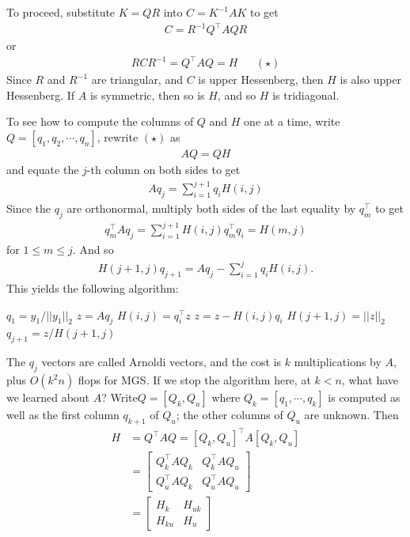 \documentclass[11pt]{article}
\numberwithin{equation}{section}
\begin{document}
To proceed, substitute $K = QR$ into $C = K^{-1}AK$ to get \begin{align*}
    C = R^{-1}Q^\top AQR 
\end{align*} 
or \begin{align*}
    RCR^{-1} = Q^\top AQ = H && (\star)
\end{align*}
Since $R$ and $R^{-1}$ are triangular, and $C$ is upper Hessenberg, then $H$ is also upper Hessenberg. If $A$ is symmetric, then so is $H$, 
and so $H$ is tridiagonal.

To see how to compute the columns of $Q$ and $H$ one at a time, write $Q=\left[ q_1, q_2, \cdots, q_n \right]$, rewrite $(\star)$ as \begin{align*}
    AQ=QH
\end{align*}
and equate the $j$-th column on both sides to get \begin{align*}
    Aq_j = \sum_{i=1}^{j+1} q_i H(i,j)
\end{align*}
Since the $q_j$ are orthonormal, multiply both sides of the last equality by $q_m^\top$ to get \begin{align*}
    q_m^\top Aq_j = \sum_{i=1}^{j+1} H(i,j) q_m^\top q_i = H(m,j)
\end{align*}
for $1 \leq m \leq j$. And so \begin{align*}
    H(j+1,j)  q_{j+1} = A q_j - \sum_{i=1}^{j} q_i H(i,j).
\end{align*}
This yields the following algorithm:
\begin{algorithmfrm}
    \begin{algorithmic}
        \State $ q_1 = y_1 / ||y_1||_2 $
            \State $z = Aq_j$
                \State $H(i,j) = q_i^\top z$
                \State $z = z - H(i,j)q_i$
            \EndFor
            \State $H(j+1,j) = ||z||_2$
            \State $q_{j+1} = z / H(j+1,j)$
        \EndFor
    \end{algorithmic}
\end{algorithmfrm}
The $q_j$ vectors are called Arnoldi vectors, and the cost is $k$ multiplications by $A$, plus $O(k^2 n)$ flops for MGS. If we stop the algorithm here, at $k < n$, 
what have we learned about $A$? Write$ Q = [Q_k,Q_u]$ where $Q_k = [q_1, \cdots, q_k]$ is computed as well as the first column $q_{k+1}$ of $Q_u$; 
the other columns of $Q_u$ are unknown. Then \begin{align*}
    H &= Q^\top AQ = [Q_k,Q_u]^\top A [Q_k,Q_u] \\
    &= \left[\begin{array}{ll}
        Q_{k}^{\top} A Q_{k} & Q_{k}^{\top} A Q_{u} \\
        Q_{u}^{\top} A Q_{k} & Q_{u}^{\top} A Q_{u}
        \end{array}\right] \\
    &= \left[\begin{array}{ll}
        H_{k} & H_{u k} \\
        H_{ku} & H_{u}
        \end{array}\right]
\end{align*}
\end{document}

